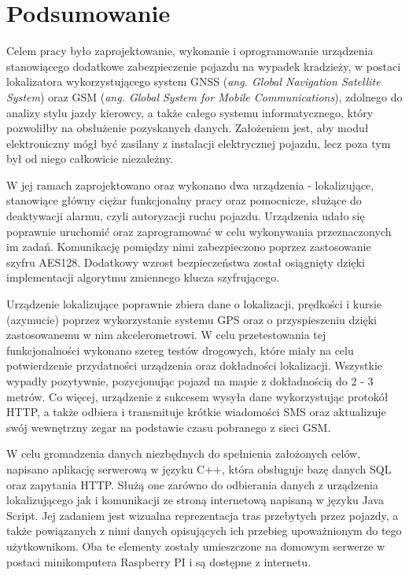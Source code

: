 \chapter{Podsumowanie}
\label{summary}

Celem pracy było zaprojektowanie, wykonanie i oprogramowanie urządzenia stanowiącego dodatkowe zabezpieczenie pojazdu na wypadek kradzieży, w postaci lokalizatora wykorzystującego system GNSS (\textit{ang. Global Navigation Satellite System}) oraz GSM (\textit{ang. Global System for Mobile Communications}), zdolnego do analizy stylu jazdy kierowcy, a także całego systemu informatycznego, który pozwoliłby na obsłużenie pozyskanych danych. Założeniem jest, aby moduł elektroniczny mógł być zasilany z instalacji elektrycznej pojazdu, lecz poza tym był od niego całkowicie niezależny.

W jej ramach zaprojektowano oraz wykonano dwa urządzenia - lokalizujące, stanowiące główny ciężar funkcjonalny pracy oraz pomocnicze, służące do deaktywacji alarmu, czyli autoryzacji ruchu pojazdu. Urządzenia udało się poprawnie uruchomić oraz zaprogramować w celu wykonywania przeznaczonych im zadań. Komunikację pomiędzy nimi zabezpieczono poprzez zastosowanie szyfru AES128. Dodatkowy wzrost bezpieczeństwa został osiągnięty dzięki implementacji algorytmu zmiennego klucza szyfrującego.

Urządzenie lokalizujące poprawnie zbiera dane o lokalizacji, prędkości i kursie (azymucie) poprzez wykorzystanie systemu GPS oraz o przyspieszeniu dzięki zastosowanemu w nim akcelerometrowi. W celu przetestowania tej funkcjonalności wykonano szereg testów drogowych, które miały na celu potwierdzenie przydatności urządzenia oraz dokładności lokalizacji. Wszystkie wypadły pozytywnie, pozycjonując pojazd na mapie z dokładnością do 2 - 3 metrów. Co więcej, urządzenie z sukcesem wysyła dane wykorzystując protokół HTTP, a także odbiera i transmituje krótkie wiadomości SMS oraz aktualizuje swój wewnętrzny zegar na podstawie czasu pobranego z sieci GSM.

W celu gromadzenia danych niezbędnych do spełnienia założonych celów, napisano aplikację serwerową w języku C++, która obsługuje bazę danych SQL oraz zapytania HTTP. Służą one zarówno do odbierania danych z urządzenia lokalizującego jak i komunikacji ze stroną internetową napisaną w języku Java Script. Jej zadaniem jest wizualna reprezentacja tras przebytych przez pojazdy, a także powiązanych z nimi danych opisujących ich przebieg upoważnionym do tego użytkownikom. Oba te elementy zostały umieszczone na domowym serwerze w postaci minikomputera Raspberry PI i są dostępne z internetu. 

